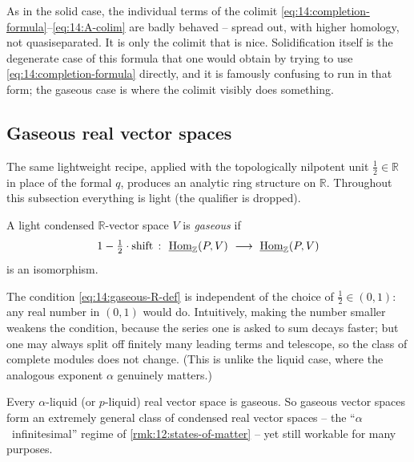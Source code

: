 \begin{remark}
\label{rmk:14:individual-terms}
As in the solid case, the individual terms of the colimit
\eqref{eq:14:completion-formula}--\eqref{eq:14:A-colim} are badly behaved -- spread
out, with higher homology, not quasiseparated. It is only the colimit that is nice.
Solidification itself is the degenerate case of this formula that one would obtain
by trying to use \eqref{eq:14:completion-formula} directly, and it is famously
confusing to run in that form; the gaseous case is where the colimit visibly does
something.
\end{remark}

\subsection{Gaseous real vector spaces}

The same lightweight recipe, applied with the topologically nilpotent unit
$\tfrac12\in\mathbb{R}$ in place of the formal $q$, produces an analytic ring
structure on $\mathbb{R}$. Throughout this subsection everything is light (the
qualifier is dropped).

\begin{definition}
\label{def:14:gaseous-R}
A light condensed $\mathbb{R}$-vector space $V$ is \emph{gaseous} if
\begin{equation}
\label{eq:14:gaseous-R-def}
1-\tfrac12\cdot\mathrm{shift}\ \colon\ \iHom_{\mathbb{Z}}(P,V)\ \longrightarrow\ \iHom_{\mathbb{Z}}(P,V)
\end{equation}
is an isomorphism.
\end{definition}

\begin{remark}
\label{rmk:14:independent-half}
The condition \eqref{eq:14:gaseous-R-def} is independent of the choice of
$\tfrac12\in(0,1)$: any real number in $(0,1)$ would do. Intuitively, making the
number smaller weakens the condition, because the series one is asked to sum decays
faster; but one may always split off finitely many leading terms and telescope, so
the class of complete modules does not change. (This is unlike the liquid case,
where the analogous exponent $\alpha$ genuinely matters.)
\end{remark}

\begin{remark}
\label{rmk:14:gaseous-weakest}
Every $\alpha$-liquid (or $p$-liquid) real vector space is gaseous. So gaseous
vector spaces form an extremely general class of condensed real vector spaces -- the
``$\alpha$~infinitesimal'' regime of \cref{rmk:12:states-of-matter} -- yet still
workable for many purposes.
\end{remark}

